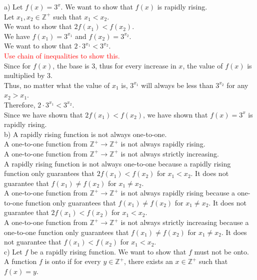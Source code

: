 \documentclass[12pt]{exam}
\begin{document}
\begin{solution}
	a) Let $f(x) = 3^x$. We want to show that $f(x)$ is rapidly rising.\\
	Let $x_1, x_2 \in \mathbb{Z}^+$ such that $x_1 < x_2$.\\
	We want to show that $2f(x_1) < f(x_2)$.\\
	We have $f(x_1) = 3^{x_1}$ and $f(x_2) = 3^{x_2}$.\\
	We want to show that $2\cdot 3^{x_1} < 3^{x_2}$.\\
	\textcolor{red}{Use chain of inequalities to show this.}\\
	Since for $f(x)$, the base is 3, thus for every increase in $x$, the value of $f(x)$ is multiplied by 3.\\
	Thus, no matter what the value of $x_1$ is, $3^{x_1}$ will always be less than $3^{x_2}$ for any $x_2 > x_1$.\\
	Therefore, $2\cdot 3^{x_1} < 3^{x_2}$.\\
	Since we have shown that $2f(x_1) < f(x_2)$, we have shown that $f(x) = 3^x$ is rapidly rising.\\
	b) A rapidly rising function is not always one-to-one.\\
	A one-to-one function from $\mathbb{Z}^+\to\mathbb{Z}^+$ is not always rapidly rising.\\
	A one-to-one function from $\mathbb{Z}^+\to\mathbb{Z}^+$ is not always strictly increasing.\\
	A rapidly rising function is not always one-to-one because a rapidly rising function only guarantees that $2f(x_1) < f(x_2)$ for $x_1 < x_2$. It does not guarantee that $f(x_1) \neq f(x_2)$ for $x_1 \neq x_2$.\\
	A one-to-one function from $\mathbb{Z}^+\to\mathbb{Z}^+$ is not always rapidly rising because a one-to-one function only guarantees that $f(x_1) \neq f(x_2)$ for $x_1 \neq x_2$. It does not guarantee that $2f(x_1) < f(x_2)$ for $x_1 < x_2$.\\
	A one-to-one function from $\mathbb{Z}^+\to\mathbb{Z}^+$ is not always strictly increasing because a one-to-one function only guarantees that $f(x_1) \neq f(x_2)$ for $x_1 \neq x_2$. It does not guarantee that $f(x_1) < f(x_2)$ for $x_1 < x_2$.\\
	c) Let $f$ be a rapidly rising function. We want to show that $f$ must not be onto.\\
	A function $f$ is onto if for every $y\in\mathbb{Z}^+$, there exists an $x\in\mathbb{Z}^+$ such that $f(x) = y$.\\

\end{solution}
\end{document}
